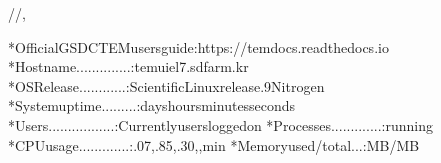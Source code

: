 \documentclass[a4paper,11pt,english]{sphinxmanual}
\begin{document}
\begin{sphinxVerbatim}[commandchars=\\\{\}]
\PYGZus{}\PYGZus{}\PYGZus{}\PYGZus{}\PYGZus{}\PYGZus{}\PYGZus{}/\PYGZus{}\PYGZus{}\PYGZus{}\PYGZus{}/\PYGZus{}\PYGZus{}\PYGZus{}\PYGZus{}\PYGZus{}\PYGZus{}\PYGZus{}\PYGZus{}\PYGZus{}\PYGZus{}\PYGZus{}\PYGZus{}\PYGZus{},\PYGZus{}\PYGZus{}\PYGZus{}\PYGZus{}\PYGZus{}

*OfficialGSDCTEMusersguide:https://tem\PYGZhy{}docs.readthedocs.io
*Hostname..............:tem\PYGZhy{}ui\PYGZhy{}el7.sdfarm.kr
*OSRelease............:ScientificLinuxrelease.9Nitrogen
*Systemuptime.........:dayshoursminutesseconds
*Users.................:Currentlyusersloggedon
*Processes.............:running
*CPUusage.............:.07,.85,.30,,min
*Memoryused/total...:MB/MB

\end{sphinxVerbatim}
\end{document}
